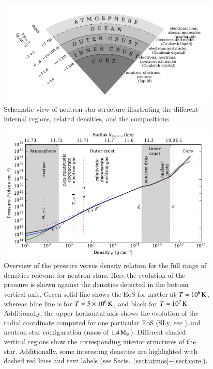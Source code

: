 \begin{figure}[t!]
\centering
\includegraphics[width=15.5cm]{figs/slice/atmos.pdf}
\caption{\label{fig:pizza}
Schematic view of neutron star structure illustrating the different internal regions, related densities, and the compositions.
}
\end{figure}


\begin{figure}[t!]
\centering
\includegraphics[width=15.5cm]{figs/eos/eos.pdf}
\caption{\label{fig:eos}
Overview of the pressure versus density relation for the full range of densities relevant for neutron stars.
Here the evolution of the pressure is shown against the densities depicted in the bottom vertical axis.
Green solid line shows the EoS for matter at $T=10^6\, \mathrm{K}$, whereas blue line is for $T=5 \times 10^{6}\, \mathrm{K}$, and black for $T=10^7 \, \mathrm{K}$.
Additionally, the upper horizontal axis shows the evolution of the radial coordinate computed for one particular EoS (SLy, see ) and neutron star configuration (mass of $1.4\, \mathrm{M}_{\odot}$).
Different shaded vertical regions show the corresponding interior structures of the star.
Additionally, some interesting densities are highlighted with dashed red lines and text labels (see Sects.~\ref{sect:atmos}$-$\ref{sect:core}). 
}
\end{figure}

